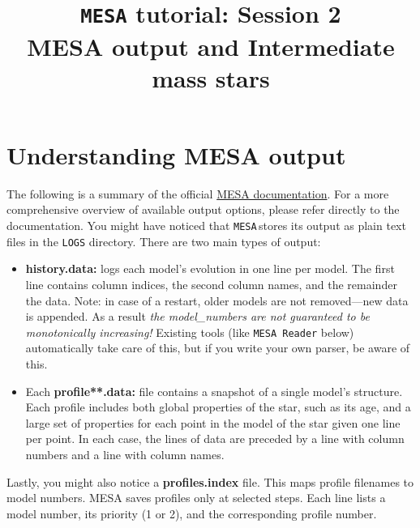 \documentclass[11pt,a4paper]{article}
\newcommand{\MESA}{\texttt{MESA}\,}
\begin{document}
\title{
    \textbf{\texttt{MESA} tutorial: Session 2} \\
    \textbf{\Large MESA output and Intermediate mass stars}
}
\date{}
\maketitle
\vspace{-1cm}



\section{Understanding MESA output}

The following is a summary of the official \href{https://docs.mesastar.org/en/latest/using_mesa/output.html}{MESA documentation}. For a more comprehensive overview of available output options, please refer directly to the documentation.
%
You might have noticed that \MESA stores its output as plain text files in the \texttt{LOGS} directory. 
%
There are two main types of output:

\begin{itemize}
  \item \textbf{history.data:} logs each model's evolution in one line per model. The first line contains column indices, the second column names, and the remainder the data. Note: in case of a restart, older models are not removed—new data is appended. As a result \textit{the model\_numbers are not guaranteed to be monotonically increasing!} Existing tools (like \texttt{MESA Reader} below) automatically take care of this, but if you write your own parser, be aware of this.
  
  \item Each \textbf{profile**.data:} file contains a snapshot of a single model's structure. Each profile includes both global properties of the star, such as its age, and a large set of properties for each point in the model of the star given one line per point. In each case, the lines of data are preceded by a line with column numbers and a line with column names. 

\end{itemize}

\noindent Lastly, you might also notice a \textbf{profiles.index} file. This maps profile filenames to model numbers. MESA saves profiles only at selected steps. Each line lists a model number, its priority (1 or 2), and the corresponding profile number.
\end{document}
